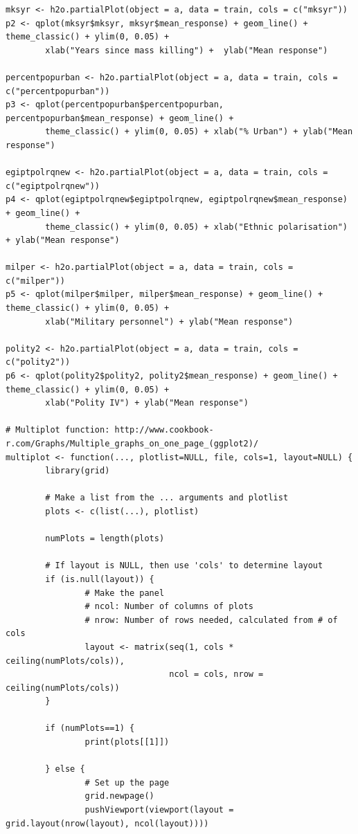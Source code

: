 \begin{verbatim}
mksyr <- h2o.partialPlot(object = a, data = train, cols = c("mksyr"))
p2 <- qplot(mksyr$mksyr, mksyr$mean_response) + geom_line() + theme_classic() + ylim(0, 0.05) +
        xlab("Years since mass killing") +  ylab("Mean response")

percentpopurban <- h2o.partialPlot(object = a, data = train, cols = c("percentpopurban"))
p3 <- qplot(percentpopurban$percentpopurban, percentpopurban$mean_response) + geom_line() +
        theme_classic() + ylim(0, 0.05) + xlab("% Urban") + ylab("Mean response")

egiptpolrqnew <- h2o.partialPlot(object = a, data = train, cols = c("egiptpolrqnew"))
p4 <- qplot(egiptpolrqnew$egiptpolrqnew, egiptpolrqnew$mean_response) + geom_line() +
        theme_classic() + ylim(0, 0.05) + xlab("Ethnic polarisation") + ylab("Mean response")

milper <- h2o.partialPlot(object = a, data = train, cols = c("milper"))
p5 <- qplot(milper$milper, milper$mean_response) + geom_line() + theme_classic() + ylim(0, 0.05) +
        xlab("Military personnel") + ylab("Mean response")

polity2 <- h2o.partialPlot(object = a, data = train, cols = c("polity2"))
p6 <- qplot(polity2$polity2, polity2$mean_response) + geom_line() + theme_classic() + ylim(0, 0.05) +
        xlab("Polity IV") + ylab("Mean response")
        
# Multiplot function: http://www.cookbook-r.com/Graphs/Multiple_graphs_on_one_page_(ggplot2)/
multiplot <- function(..., plotlist=NULL, file, cols=1, layout=NULL) {
        library(grid)
        
        # Make a list from the ... arguments and plotlist
        plots <- c(list(...), plotlist)
        
        numPlots = length(plots)
        
        # If layout is NULL, then use 'cols' to determine layout
        if (is.null(layout)) {
                # Make the panel
                # ncol: Number of columns of plots
                # nrow: Number of rows needed, calculated from # of cols
                layout <- matrix(seq(1, cols * ceiling(numPlots/cols)),
                                 ncol = cols, nrow = ceiling(numPlots/cols))
        }
        
        if (numPlots==1) {
                print(plots[[1]])
                
        } else {
                # Set up the page
                grid.newpage()
                pushViewport(viewport(layout = grid.layout(nrow(layout), ncol(layout))))
                

\end{verbatim}
